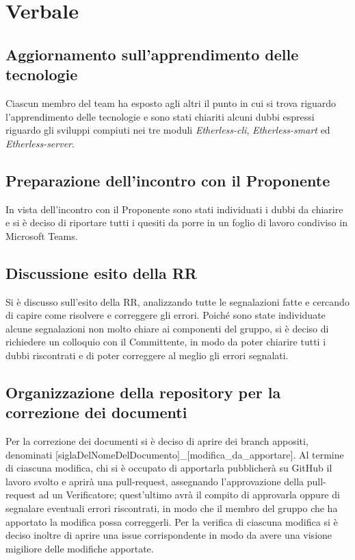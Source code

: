 \section{Verbale}

	\subsection{Aggiornamento sull'apprendimento delle tecnologie}
		Ciascun membro del team ha esposto agli altri il punto in cui si trova riguardo l'apprendimento delle tecnologie e sono stati chiariti alcuni dubbi espressi riguardo gli sviluppi compiuti nei tre moduli \textit{Etherless-cli}, \textit{Etherless-smart} ed \textit{Etherless-server}.
		
	\subsection{Preparazione dell'incontro con il Proponente}
		In vista dell'incontro con il Proponente sono stati individuati i dubbi da chiarire e si è deciso di riportare tutti i quesiti da porre in un foglio di lavoro condiviso in Microsoft Teams.
		
	\subsection{Discussione esito della RR} 
		Si è discusso sull'esito della RR, analizzando tutte le segnalazioni fatte e cercando di capire come risolvere e correggere gli errori.
		Poiché sono state individuate alcune segnalazioni non molto chiare ai componenti del gruppo, si è deciso di richiedere un colloquio con il Committente, in modo da poter chiarire tutti i dubbi riscontrati e di poter correggere al meglio gli errori segnalati.
	
	\subsection{Organizzazione della repository per la correzione dei documenti}
		Per la correzione dei documenti si è deciso di aprire dei branch appositi, denominati [siglaDelNomeDelDocumento]\_[modifica\_da\_apportare].
		Al termine di ciascuna modifica, chi si è occupato di apportarla pubblicherà su GitHub il lavoro svolto e aprirà una pull-request, assegnando l'approvazione della pull-request ad un Verificatore; quest'ultimo avrà il compito di approvarla oppure di segnalare eventuali errori riscontrati, in modo che il membro del gruppo che ha apportato la modifica possa correggerli.
		Per la verifica di ciascuna modifica si è deciso inoltre di aprire una issue corrispondente in modo da avere una visione migiliore delle modifiche apportate.
	
